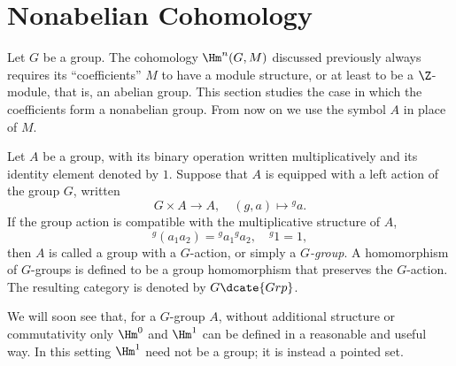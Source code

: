 
\section{Nonabelian Cohomology}\label{sec:nonabelian-coh}
\hypertarget{o014.aljabr2.chapter6.nonabelian-cohomology}{ }
Let $G$ be a group. The cohomology $\Hm^n(G,M)$ discussed previously always
requires its ``coefficients'' $M$ to have a module structure, or at least to
be a $\Z$-module, that is, an abelian group. This section studies the case in
which the coefficients form a nonabelian group. From now on we use the symbol
$A$ in place of $M$.

\begin{definition}\label{def:G-group}
	Let $A$ be a group, with its binary operation written multiplicatively
	and its identity element denoted by $1$. Suppose that $A$ is equipped with
	a left action of the group $G$, written
	\[ G \times A \to A, \quad (g, a) \mapsto {}^g a . \]
	If the group action is compatible with the multiplicative structure of
	$A$,
	\[ {}^g (a_1 a_2) = {}^g a_1 {}^g a_2, \quad {}^g 1 = 1, \]
	then $A$ is called a group with a $G$-action, or simply a
	\emph{$G$-group}. A homomorphism of $G$-groups is defined to be a group
	homomorphism that preserves the $G$-action. The resulting category is
	denoted by $G\dcate{Grp}$.
\end{definition}

We will soon see that, for a $G$-group $A$, without additional structure or
commutativity only $\Hm^0$ and $\Hm^1$ can be defined in a reasonable and
useful way. In this setting $\Hm^1$ need not be a group; it is instead a
pointed set.

